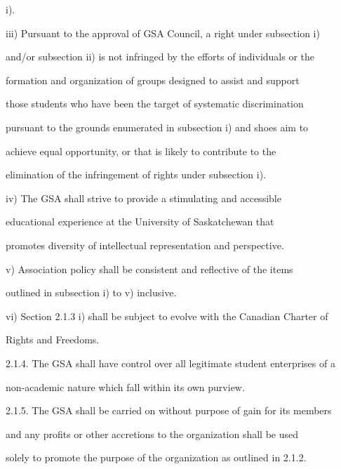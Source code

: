         i).  



iii)    Pursuant to the approval of GSA Council, a right under subsection i)  

        and/or subsection ii) is not infringed by the efforts of individuals or the  

        formation  and  organization  of  groups  designed  to  assist  and  support  

        those students who have been the target of systematic discrimination  

        pursuant to the grounds enumerated in subsection i) and shoes aim to  

        achieve  equal  opportunity,  or  that  is  likely  to  contribute  to  the  

        elimination of the infringement of rights under subsection i).  



iv)     The   GSA   shall   strive   to   provide   a   stimulating   and   accessible  

        educational       experience       at  the    University      of   Saskatchewan         that  

        promotes diversity of intellectual representation and perspective.  



v)      Association  policy  shall  be  consistent  and  reflective  of  the  items  

        outlined in subsection i) to v) inclusive.  



vi)      Section 2.1.3 i) shall be subject to evolve with the Canadian Charter of  

        Rights and Freedoms.  



2.1.4. The GSA shall have control over all legitimate student enterprises of a  

        non-academic nature which fall within its own purview.  



2.1.5. The GSA shall be carried on without purpose of gain for its members  

        and  any  profits  or  other  accretions  to  the  organization  shall  be  used  

        solely to promote the purpose of the organization as outlined in 2.1.2.  



